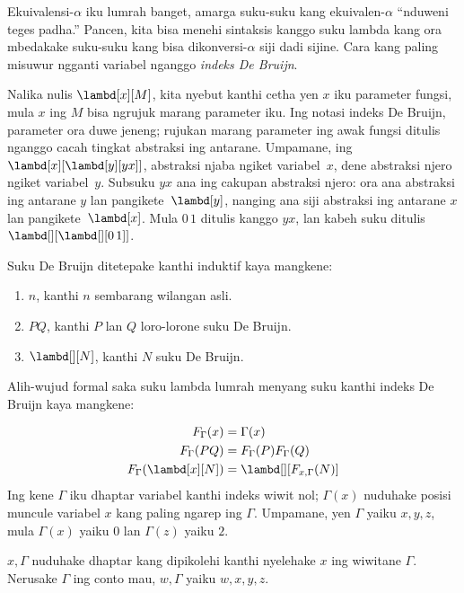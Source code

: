 \documentclass[../../../include/open-logic-section]{subfiles}
\begin{document}


Ekuivalensi-$\alpha$ iku lumrah banget,
amarga suku-suku kang ekuivalen-$\alpha$
``nduweni teges padha.'' Pancen,
kita bisa menehi sintaksis kanggo
suku lambda kang ora mbedakake
suku-suku kang bisa dikonversi-$\alpha$
siji dadi sijine. Cara kang paling
misuwur ngganti variabel nganggo
\emph{indeks De Bruijn}.

Nalika nulis $\lambd[x][M]$,
kita nyebut kanthi cetha yen $x$
iku parameter fungsi, mula $x$
ing $M$ bisa ngrujuk marang
parameter iku. Ing notasi
indeks De Bruijn, parameter ora
duwe jeneng; rujukan marang
parameter ing awak fungsi ditulis
nganggo cacah tingkat abstraksi
ing antarane. Umpamane,
ing $\lambd[x][\lambd[y][y x]]$,
abstraksi njaba ngiket variabel~$x$,
dene abstraksi njero ngiket
variabel~$y$. Subsuku $y x$
ana ing cakupan abstraksi njero:
ora ana abstraksi ing antarane
$y$ lan pangikete~$\lambd[y]$,
nanging ana siji abstraksi
ing antarane $x$ lan
pangikete~$\lambd[x]$.
Mula $0\, 1$ ditulis kanggo $y x$,
lan kabeh suku ditulis
$\lambd[][\lambd[][0\,1]]$.

\begin{defn}
  Suku De Bruijn ditetepake
  kanthi induktif kaya mangkene:
  \begin{enumerate}
  \item $n$, kanthi $n$ sembarang
    wilangan asli.
  \item $PQ$, kanthi $P$ lan $Q$
    loro-lorone suku De Bruijn.
  \item $\lambd[][N]$, kanthi $N$
    suku De Bruijn.
  \end{enumerate}
\end{defn}

Alih-wujud formal saka suku lambda
lumrah menyang suku kanthi
indeks De Bruijn kaya mangkene:
\begin{defn}
  \begin{align*}
    F_\Gamma(x) &= \Gamma(x) \\
    F_\Gamma(PQ) &= F_\Gamma(P)F_\Gamma(Q) \\
    F_\Gamma(\lambd[x][N]) &= \lambd[][F_{x,\Gamma}(N)]
  \end{align*}
  Ing kene $\Gamma$ iku dhaptar
  variabel kanthi indeks wiwit nol;
  $\Gamma(x)$ nuduhake posisi
  muncule variabel $x$ kang
  paling ngarep ing $\Gamma$.
  Umpamane, yen $\Gamma$ yaiku
  $x,y,z$, mula $\Gamma(x)$ yaiku
  $0$ lan $\Gamma(z)$ yaiku $2$.
  
  $x,\Gamma$ nuduhake dhaptar
  kang dipikolehi kanthi nyelehake
  $x$ ing wiwitane $\Gamma$.
  Nerusake $\Gamma$ ing conto mau,
  $w,\Gamma$ yaiku $w,x,y,z$.
\end{defn}
\end{document}
